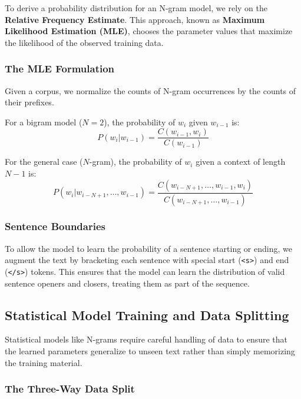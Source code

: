 \documentclass[
  italian,
  11pt,
]{article}
\begin{document}
To derive a probability distribution for an N-gram model, we rely on the
\textbf{Relative Frequency Estimate}. This approach, known as
\textbf{Maximum Likelihood Estimation (MLE)}, chooses the parameter
values that maximize the likelihood of the observed training data.

\subsubsection{The MLE Formulation}\label{the-mle-formulation}

Given a corpus, we normalize the counts of N-gram occurrences by the
counts of their prefixes.

For a bigram model (\(N=2\)), the probability of \(w_i\) given
\(w_{i-1}\) is:
\[P(w_i | w_{i-1}) = \frac{C(w_{i-1}, w_i)}{C(w_{i-1})}\]

For the general case (\(N\)-gram), the probability of \(w_i\) given a
context of length \(N-1\) is:
\[P(w_i | w_{i-N+1}, \dots, w_{i-1}) = \frac{C(w_{i-N+1}, \dots, w_{i-1}, w_i)}{C(w_{i-N+1}, \dots, w_{i-1})}\]

\subsubsection{Sentence Boundaries}\label{sentence-boundaries}

To allow the model to learn the probability of a sentence starting or
ending, we augment the text by bracketing each sentence with special
start (\texttt{\textless{}s\textgreater{}}) and end
(\texttt{\textless{}/s\textgreater{}}) tokens. This ensures that the
model can learn the distribution of valid sentence openers and closers,
treating them as part of the sequence.

\subsection{Statistical Model Training and Data
Splitting}\label{statistical-model-training-and-data-splitting}

Statistical models like N-grams require careful handling of data to
ensure that the learned parameters generalize to unseen text rather than
simply memorizing the training material.

\subsubsection{The Three-Way Data Split}\label{the-three-way-data-split}
\end{document}
